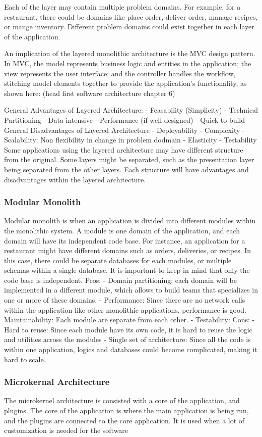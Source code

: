 Each of the layer may contain multiple problem domains. For example, for a restaurant, there could be domains like place order, 
deliver order, manage recipes, or mange inventory. Different problem domains could exist together in each layer of  the application. 

An implication of the layered monolithic architecture is the MVC design pattern.
In MVC, the model represents business logic and entities in the application; the view represents the user interface; 
and the controller handles the workflow, stitching model elements together to provide the application’s functionality, as shown here: (head first software architecture chapter 6)

General Advantages of Layered Architecture:
-	Feasability (Simplicity)
-	Technical Partitioning
-	Data-intensive
-	Performance (if well designed)
-	Quick to build
-	
General Disadvantages of Layered Architecture
-	Deployability
-	Complexity
-	Scalability: Non flexibility in change in problem dodmain
-	Elasticity
-	Testability
Some applications using the layered architecture may have different structure from the original. Some layers might be separated, 
such as the presentation layer being separated from the other layers. Each structure will have advantages and disadvantages within the layered architecture.

\subsubsection[Modular Monolith]{Modular Monolith}
Modular monolith is when an application is divided into different modules within the monolithic system. A module is one domain of the application,
and each domain will have its independent code base. For instance, an application for a restaurant might have different domains such as orders, deliveries, or recipes.
In this case, there could be separate databases for each modules, or multiple schemas within a single database.
It is important to keep in mind that only the code base is independent.
Pros: 
-	Domain partitioning: each domain will be implemented in a different module, which allows to build teams that specializes in one or more of these domains.
-	Performance: Since there are no network calls within the application like other monolithic applications, performance is good.
-	Maintainability: Each module are separate from each other.
-	Testability:
Cons:
-	Hard to reuse: Since each module have its own code, it is hard to reuse the logic and utilities across the modules
-	Single set of architecture: Since all the code is within one application, logics and databases could become complicated, making it hard to scale.

\subsubsection[Microkernal Architecture]{Microkernal Architecture}
The microkernel architecture is consisted with a core of the application, and plugins. 
The core of the application is where the main application is being run, and the plugins are connected to the core application. 
It is used when a lot of customization is needed for the software